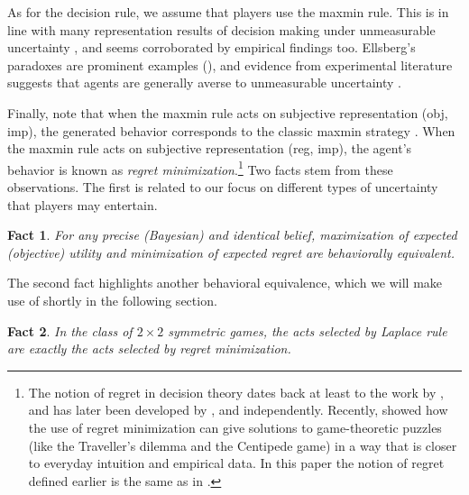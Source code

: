 \documentclass[fleqn,reqno,12pt]{article}
\theoremstyle{Satz}
\newtheorem{fact}{Fact}
\theoremstyle{Bsp}
\begin{document}
As for the decision rule, we assume that players use the maxmin rule. This is in line with many representation
results of decision making under unmeasurable uncertainty \citep[e.g.,][]{gilsch89,GhirMar02},
and seems corroborated by empirical findings too. Ellsberg's paradoxes are prominent examples (\citet{ells61}), and evidence from experimental literature suggests that agents are generally averse to unmeasurable uncertainty \citep[e.g.,][]{TrautKuil16}.

Finally, note that when the maxmin rule acts on subjective representation (obj, imp), the
generated behavior corresponds to the classic maxmin strategy \citep{neumorg44}. When the maxmin rule acts on
subjective representation (reg, imp), the agent's behavior is known as \textit{regret
  minimization}.\footnote{The notion of regret in decision theory dates back at least to the
  work by \citet{Savage1951:The-theory-of-s}, and has later been developed by \citet{bell82},
  \citet{Fishburn1982} and \citet{loosug82} independently. Recently,
  \citet{HalpernPass2012:Iterated-Regret} showed how the use of regret minimization can give
  solutions to game-theoretic puzzles (like the Traveller's dilemma and the Centipede game)
  in a way that is closer to everyday intuition and empirical data. In this paper the notion of
  regret defined earlier is the same as in \citet{HalpernPass2012:Iterated-Regret}.} Two facts
stem from these observations.  The first is related to our focus on different types of
uncertainty that players may entertain.
\begin{fact} \label{fact:maxEU-minReg} 
For any precise (Bayesian) and identical belief, maximization of expected (objective) utility and minimization of expected regret are behaviorally equivalent. %
\end{fact}
\noindent The second fact highlights another behavioral equivalence, which we will make use of shortly in the following section.
\begin{fact} \label{fact:equivalence2x2} In the class of $2 \times 2$ symmetric games, the acts
  selected by Laplace rule are exactly the acts selected by regret minimization.
\end{fact} 
\end{document}
